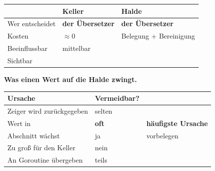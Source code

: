\begin{merksatz}
\begin{center}
\renewcommand{\arraystretch}{1.5}
\begin{tabular}{@{}P{2.6cm}P{2.6cm}P{3.0cm}@{}}
\toprule
& \textbf{Keller} & \textbf{Halde}\\
\midrule
Wer entscheidet & \textbf{der Übersetzer} & \textbf{der Übersetzer}\\
Kosten & \textcolor{gruen}{$\approx0$} & \textcolor{akzent}{Belegung + Bereinigung}\\
Beeinflussbar & \textcolor{mittel}{mittelbar} & \\
Sichtbar & \textcolor{gruen}{} & \\
\bottomrule
\end{tabular}
\end{center}

\begin{center}
\begin{minipage}{0.88\textwidth}
\end{minipage}
\end{center}

\textbf{Was einen Wert auf die Halde zwingt.}

\begin{center}
\renewcommand{\arraystretch}{1.45}
\begin{tabular}{@{}P{3.2cm}P{2.2cm}P{2.6cm}@{}}
\toprule
\textbf{Ursache} & \textbf{Vermeidbar?} & \\
\midrule
Zeiger wird zurückgegeben & \textcolor{akzent}{selten} & \\
Wert in  & \textcolor{gruen}{\textbf{oft}} & \textbf{häufigste Ursache}\\
Abschnitt wächst & \textcolor{gruen}{ja} & \textcolor{gruen}{vorbelegen}\\
Zu groß für den Keller & \textcolor{akzent}{nein} & \\
An Goroutine übergeben & \textcolor{mittel}{teils} & \\
\bottomrule
\end{tabular}
\end{center}

\begin{center}
\end{center}


\end{merksatz}
